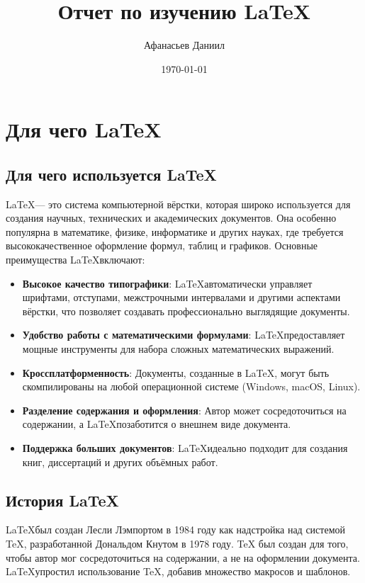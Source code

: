 \documentclass[a4paper, 14pt]{extarticle}
\begin{document}
	\title{Отчет по изучению \LaTeX{}}
	\author{Афанасьев Даниил}
	\date{\today}
	
	\maketitle
	
	\newpage
	
	\tableofcontents
	
	\newpage
	\centering
	
	\section{Для чего \LaTeX}
	
	\subsection{Для чего используется \LaTeX}
	\LaTeX — это система компьютерной вёрстки, которая широко используется для создания научных, технических и академических документов. Она особенно популярна в математике, физике, информатике и других науках, где требуется высококачественное оформление формул, таблиц и графиков. Основные преимущества \LaTeX включают:
	
	\begin{itemize}
		\item \textbf{Высокое качество типографики}: \LaTeX автоматически управляет шрифтами, отступами, межстрочными интервалами и другими аспектами вёрстки, что позволяет создавать профессионально выглядящие документы.
		\item \textbf{Удобство работы с математическими формулами}: \LaTeX предоставляет мощные инструменты для набора сложных математических выражений.
		\item \textbf{Кроссплатформенность}: Документы, созданные в \LaTeX, могут быть скомпилированы на любой операционной системе (Windows, macOS, Linux).
		\item \textbf{Разделение содержания и оформления}: Автор может сосредоточиться на содержании, а \LaTeX позаботится о внешнем виде документа.
		\item \textbf{Поддержка больших документов}: \LaTeX идеально подходит для создания книг, диссертаций и других объёмных работ.
	\end{itemize}
	
	\newpage
	
	\subsection{История \LaTeX}
	\LaTeX был создан Лесли Лэмпортом в 1984 году как надстройка над системой TeX, разработанной Дональдом Кнутом в 1978 году. TeX был создан для того, чтобы автор мог сосредоточиться на содержании, а не на оформлении документа. \LaTeX упростил использование TeX, добавив множество макросов и шаблонов.
	
\end{document}
